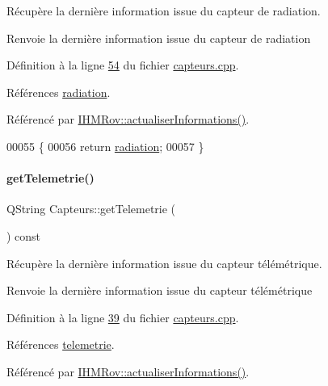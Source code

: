 Récupère la dernière information issue du capteur de radiation. 

\begin{DoxyReturn}{Renvoie}
la dernière information issue du capteur de radiation 
\end{DoxyReturn}


Définition à la ligne \hyperlink{capteurs_8cpp_source_l00054}{54} du fichier \hyperlink{capteurs_8cpp_source}{capteurs.\+cpp}.



Références \hyperlink{capteurs_8h_source_l00025}{radiation}.



Référencé par \hyperlink{ihmrov_8cpp_source_l00110}{I\+H\+M\+Rov\+::actualiser\+Informations()}.


\begin{DoxyCode}
00055 \{
00056     \textcolor{keywordflow}{return} \hyperlink{class_capteurs_ad9d6f3fd6cc164c6cd5908fd7822f307}{radiation};
00057 \}
\end{DoxyCode}
\mbox{\label{class_capteurs_ad8c2c486e92cc537dc014035b5634b60}} 
\paragraph{\texorpdfstring{get\+Telemetrie()}{getTelemetrie()}}
{\footnotesize\ttfamily Q\+String Capteurs\+::get\+Telemetrie (\begin{DoxyParamCaption}{ }\end{DoxyParamCaption}) const}



Récupère la dernière information issue du capteur télémétrique. 

\begin{DoxyReturn}{Renvoie}
la dernière information issue du capteur télémétrique 
\end{DoxyReturn}


Définition à la ligne \hyperlink{capteurs_8cpp_source_l00039}{39} du fichier \hyperlink{capteurs_8cpp_source}{capteurs.\+cpp}.



Références \hyperlink{capteurs_8h_source_l00022}{telemetrie}.



Référencé par \hyperlink{ihmrov_8cpp_source_l00110}{I\+H\+M\+Rov\+::actualiser\+Informations()}.


